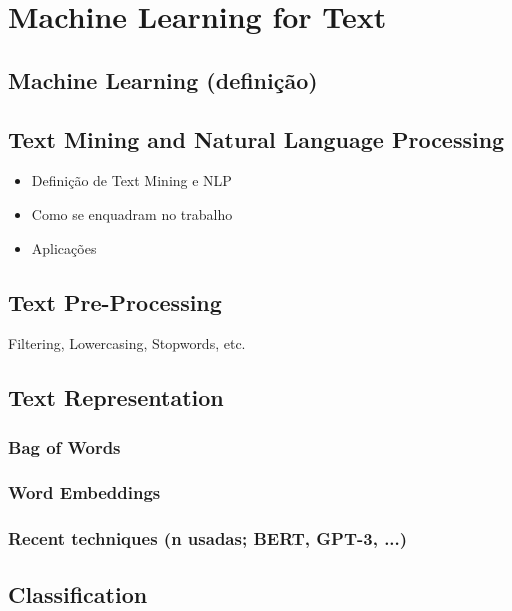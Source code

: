 \chapter{Machine Learning for Text}\label{cap:ml_text}

\section{Machine Learning (definição)}

\section{Text Mining and Natural Language Processing}

\begin{itemize}
    \setlength\itemsep{-0.5em}
    \item Definição de Text Mining e NLP
    \item Como se enquadram no trabalho
    \item Aplicações
\end{itemize}

\section{Text Pre-Processing}

Filtering, Lowercasing, Stopwords, etc.

\section{Text Representation}

\subsection{Bag of Words}

\subsection{Word Embeddings}

\subsection{Recent techniques (n usadas; BERT, GPT-3, ...)}

\section{Classification}

